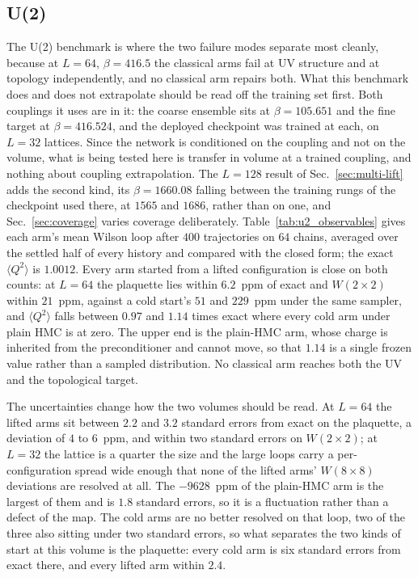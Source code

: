 \documentclass[prd, twocolumn, superscriptaddress, nofootinbib,floatfix]{revtex4-2}
\DeclareRobustCommand{\sect}[1]{Sec.~\ref{sec:#1}}
\DeclareRobustCommand{\tb}[1]{Table~\ref{tab:#1}}
\begin{document}
\subsection{U(2)}
\label{sec:u2obs}
The U(2) benchmark is where the two failure modes separate most cleanly, because
at $L=64$, $\beta=416.5$ the classical arms fail at UV structure and at topology
independently, and no classical arm repairs both. What this benchmark does and
does not extrapolate should be read off the training set first. Both couplings
it uses are in it: the coarse ensemble sits at $\beta=105.651$ and the fine
target at $\beta=416.524$, and the deployed checkpoint was trained at each, on
$L=32$ lattices. Since the network is conditioned on the coupling and not on the
volume, what is being tested here is transfer in volume at a trained coupling,
and nothing about coupling extrapolation. The $L=128$ result of
\sect{multi-lift} adds the second kind, its $\beta=1660.08$ falling between the
training rungs of the checkpoint used there, at $1565$ and $1686$, rather than
on one, and
\sect{coverage} varies coverage deliberately. \tb{u2_observables} gives each
arm's mean Wilson loop after $400$ trajectories on $64$ chains, averaged over
the settled half of every history and compared with the closed form; the exact
$\langle Q^2\rangle$ is $1.0012$. Every arm started from a lifted
configuration is close on both counts: at $L=64$ the
plaquette lies within $6.2$~ppm of exact and $W(2\times2)$ within $21$~ppm,
against a cold start's $51$ and $229$~ppm under the same sampler, and
$\langle Q^2\rangle$ falls between $0.97$ and $1.14$ times exact where every
cold arm under plain HMC is at zero. The upper end is
the plain-HMC arm, whose charge is inherited from the preconditioner and cannot
move, so that $1.14$ is a single frozen value rather than a sampled distribution. No
classical arm reaches both the UV and the topological target.

The uncertainties change how the two volumes should be read. At $L=64$ the
lifted arms sit between $2.2$ and $3.2$ standard errors from exact on the
plaquette, a deviation of $4$ to $6$~ppm, and within two standard errors on
$W(2\times2)$; at $L=32$ the lattice is a quarter the size and the large loops
carry a per-configuration spread wide enough that none of the lifted arms'
$W(8\times8)$ deviations are resolved at all. The $-9628$~ppm of the plain-HMC
arm is the largest of them and is $1.8$ standard errors, so it is a fluctuation
rather than a defect of the map. The cold arms are no better resolved on that
loop, two of the three also sitting under two standard errors, so what separates
the two kinds of start at this volume is the plaquette: every cold arm is six
standard errors from exact there, and every lifted arm within $2.4$.
\end{document}
